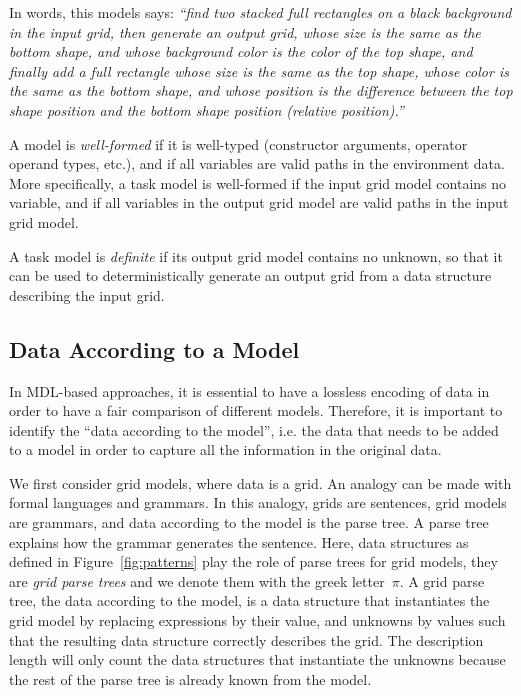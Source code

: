 \documentclass[a4paper]{llncs}
\begin{document}
In words, this models says: {\em ``find two stacked full rectangles on a
black background in the input grid, then generate an output grid,
whose size is the same as the bottom shape, and whose background color
is the color of the top shape, and finally add a full rectangle whose
size is the same as the top shape, whose color is the same as the
bottom shape, and whose position is the difference between the top
shape position and the bottom shape position (relative position).''}

A model is {\em well-formed} if it is well-typed (constructor
arguments, operator operand types, etc.), and if all variables are
valid paths in the environment data. More specifically, a task model
is well-formed if the input grid model contains no variable, and if
all variables in the output grid model are valid paths in the input
grid model.

A task model is {\em definite} if its output grid model contains no
unknown, so that it can be used to deterministically generate an
output grid from a data structure describing the input grid.


\subsection{Data According to a Model}
\label{data}

In MDL-based approaches, it is essential to have a lossless encoding
of data in order to have a fair comparison of different
models. Therefore, it is important to identify the ``data according to
the model'', i.e. the data that needs to be added to a model in order
to capture all the information in the original data.

We first consider grid models, where data is a grid. An analogy can be
made with formal languages and grammars. In this analogy, grids are
sentences, grid models are grammars, and data according to the model
is the parse tree. A parse tree explains how the grammar generates the
sentence. Here, data structures as defined in
Figure~\ref{fig:patterns} play the role of parse trees for grid
models, they are {\em grid parse trees} and we denote them with the
greek letter~$\pi$. A grid parse tree, the data according to the
model, is a data structure that instantiates the grid model by
replacing expressions by their value, and unknowns by values such that
the resulting data structure correctly describes the grid. The
description length will only count the data structures that
instantiate the unknowns because the rest of the parse tree is already
known from the model.
\end{document}
